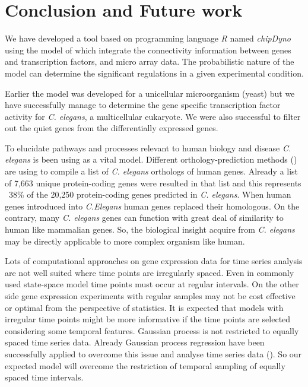 
\chapter{Conclusion and Future work}

\ifpdf
    \graphicspath{{Chapter6/Figs/Raster/}{Chapter6/Figs/PDF/}{Chapter6/Figs/}}
\else
    \graphicspath{{Chapter6/Figs/Vector/}{Chapter6/Figs/}}
\fi


We have developed a tool based on programming language \emph{R} named \emph{chipDyno} using the model of
\cite{Sanguinetti:2006} which integrate the connectivity information between genes and transcription
factors, and micro array data. The probabilistic nature of the model can determine the significant
regulations in a given experimental condition.

Earlier the model was developed for a unicellular microorganism (yeast) but we have successfully
manage to determine the gene specific transcription factor activity for \textit{C. elegans}, a
multicellular eukaryote. We were also successful to filter out the quiet genes from the
differentially expressed genes.

To elucidate pathways and processes relevant to human biology 
and disease \textit{C. elegans} is been using as a vital model. 
Different orthology-prediction methods (\cite{Shaye:2011}) are using 
to compile a list of \textit{C. elegans} orthologs of human genes. Already 
a  list of 7,663 unique protein-coding genes were resulted in that list and this
represents ~38\% of the 20,250 protein-coding genes predicted in \textit{C. elegans}. 
When human genes introduced into \textit{C.Elegans} human genes replaced their homologous. 
On the contrary, many \textit{C. elegans}
genes can function with great deal of similarity to human like mammalian genes. So, 
the biological insight acquire from \textit{C. elegans} may be directly applicable to more 
complex organism like human.

Lots of computational approaches on gene expression data for time series analysis are not
well suited where time points are irregularly spaced. Even in commonly used state-space
model time points must occur at regular intervals. On the other side gene expression
experiments with regular samples may not be cost effective or optimal from the perspective of
statistics. It is expected that models with irregular time points might be more informative if 
the time points are selected considering some temporal features. Gaussian process is not 
restricted to equally spaced time series data. Already Gaussian process regression have been 
successfully applied to overcome this issue and analyse time series data (\cite{Kalaitzis:2011}).
So our expected model will overcome the restriction of temporal sampling of equally spaced
time intervals. 

